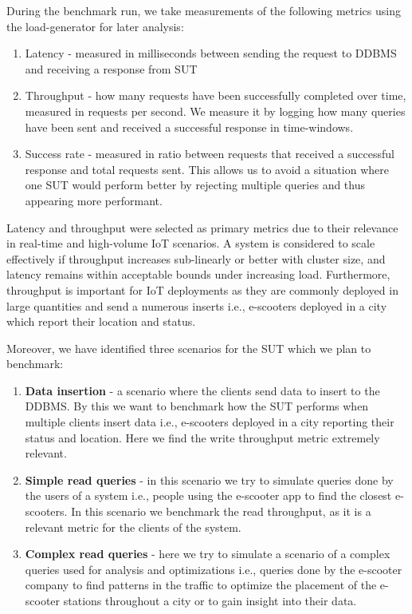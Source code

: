 During the benchmark run, we take measurements of the following metrics using the load-generator for later analysis:
\begin{enumerate}
	\item Latency - measured in milliseconds between sending the request to DDBMS and receiving a response from SUT
	\item Throughput - how many requests have been successfully completed over time, measured in requests per second.
		We measure it by logging how many queries have been sent and received a successful response in time-windows.
	\item Success rate - measured in ratio between requests that received a successful response and total requests sent.
		This allows us to avoid a situation where one SUT would perform better by rejecting multiple queries and thus appearing more performant.
\end{enumerate}

Latency and throughput were selected as primary metrics due to their relevance in real-time and high-volume IoT scenarios.
A system is considered to scale effectively if throughput increases sub-linearly or better with cluster size, and latency remains within acceptable bounds under increasing load.\cite{hossfeldComparingScalabilityCommunication2023}
Furthermore, throughput is important for IoT deployments as they are commonly deployed in large quantities and send a numerous inserts i.e., e-scooters deployed in a city which report their location and status.

Moreover, we have identified three scenarios for the SUT which we plan to benchmark:
\begin{enumerate}
	\item \textbf{Data insertion} - a scenario where the clients send data to insert to the DDBMS.
By this we want to benchmark how the SUT performs when multiple clients insert data i.e., e-scooters deployed in a city reporting their status and location.
Here we find the write throughput metric extremely relevant.
	\item \textbf{Simple read queries} - in this scenario we try to simulate queries done by the users of a system i.e., people using the e-scooter app to find the closest e-scooters.
		In this scenario we benchmark the read throughput, as it is a relevant metric for the clients of the system.
	\item \textbf{Complex read queries} - here we try to simulate a scenario of a complex queries used for analysis and optimizations i.e., queries done by the e-scooter company to find patterns in the traffic to optimize the placement of the e-scooter stations throughout a city or to gain insight into their data.
\end{enumerate}

